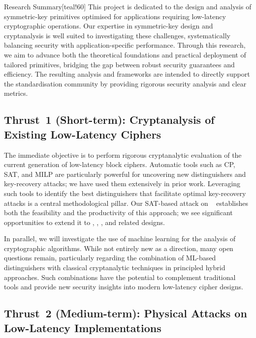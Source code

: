 \begin{genericbox}{Research Summary}[teal!60]
This project is dedicated to the design and analysis of symmetric-key primitives optimised for applications requiring low-latency cryptographic operations.
Our expertise in symmetric-key design and cryptanalysis is well suited to investigating these challenges, systematically balancing security with application-specific performance.
Through this research, we aim to advance both the theoretical foundations and practical deployment of tailored primitives, bridging the gap between robust security guarantees and efficiency.
The resulting analysis and frameworks are intended to directly support the standardisation community by providing rigorous security analysis and clear metrics.
\end{genericbox}

\subsection{Thrust~1 (Short-term): Cryptanalysis of Existing Low-Latency Ciphers}

The immediate objective is to perform rigorous cryptanalytic evaluation of the current generation of low-latency block ciphers.
Automatic tools such as CP, SAT, and MILP are particularly powerful for uncovering new distinguishers and key-recovery attacks; we have used them extensively in prior work.
Leveraging such tools to identify the best distinguishers that facilitate optimal key-recovery attacks is a central methodological pillar.
Our SAT-based attack on ~ establishes both the feasibility and the productivity of this approach; we see significant opportunities to extend it to , , , and related designs.

In parallel, we will investigate the use of machine learning for the analysis of cryptographic algorithms.
While not entirely new as a direction, many open questions remain, particularly regarding the combination of ML-based distinguishers with classical cryptanalytic techniques in principled hybrid approaches.
Such combinations have the potential to complement traditional tools and provide new security insights into modern low-latency cipher designs.

\subsection{Thrust~2 (Medium-term): Physical Attacks on Low-Latency Implementations}

